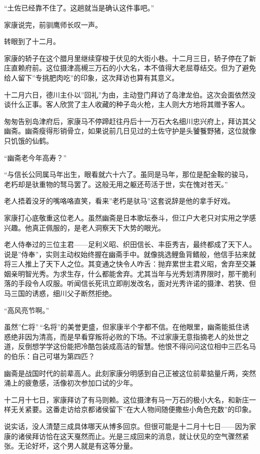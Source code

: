 \documentclass[
]{article}
\begin{document}
``土佐已经靠不住了。这趟就当是确认这件事吧。''

家康说完，前驯鹰师长叹一声。

转眼到了十二月。

家康的轿子在这个腊月里继续穿梭于伏见的大街小巷。十二月三日，轿子停在了新庄直赖府前。这位摄津高槻三万石的小大名，本不值得大老屈尊结交。但为了避免给人留下''专挑肥肉吃''的印象，这次拜访也算有其意义。

十二月六日，德川主仆以''回礼''为由，主动登门拜访了岛津龙伯。这次会面依然没谈什么正事。客人欣赏了主人收藏的种子岛火枪，主人则大方地将其赠予客人。

匆匆告别岛津府后，家康马不停蹄赶往丹后十一万石大名细川忠兴府上，拜访其父幽斋。幽斋瘦得形销骨立，如果说前几日见过的土佐守护是头饕餮野猪，这位就像只饥饿的仙鹤。

``幽斋老今年高寿？''

``与信长公同属马年出生，眼看就六十六了。虽同是马年，那位是配金鞍的骏马，老朽却是驮重物的驽马罢了。这般无用之躯还苟活于世，实在愧对苍天。''

老人捂着没牙的嘴咯咯直笑，看来''老朽是驮马''这套说辞是他的拿手好戏。

家康打心底敬重这位老人。虽然幽斋是日本歌坛泰斗，但江户大老只对实用之学感兴趣。他真正佩服的，是老人洞察天下大势的眼光。

老人侍奉过的三位主君------足利义昭、织田信长、丰臣秀吉，最终都成了天下人。说是''侍奉''，实则主动权始终握在幽斋手中。就像挑选鲤鱼背鳍般，他信手拈来就将三人推上了天下人之位。其变通之快令人咋舌：抛弃累世主君义昭，舍弃至交兼姻亲明智光秀。为求生存，什么都能舍弃。尤其当年与光秀划清界限时，那干脆利落的手段令人叹服。听闻信长死讯立即削发改名，面对光秀许诺的摄津、若狭、但马三国的诱惑，细川父子断然拒绝。

``高风亮节啊。''

虽然''仁将''\,``名将''的美誉更盛，但家康半个字都不信。在他眼里，幽斋能抵住诱惑绝非因为清高，而是早看穿叛将必败的下场。不过家康无意指摘老人的处世之道，反倒想学学这份能把冷酷包装成高洁的智慧。他恨不得问问这位相中三匹名马的伯乐：自己可堪为第四匹？

幽斋是战国时代的前辈高人。此刻家康分明感到自己正被这位前辈掂量斤两，突然涌上的疲惫感，活像初次参加口试的少年。

十二月十七日，家康拜访了有马则赖。这位摄津有马一万石的极小大名，和新庄一样无关紧要。这番走访给京都诸侯留下''在大人物间随便撒些小角色充数''的印象。

说实话，没人清楚三成具体哪天从博多回京。但很可能是十二月十七日------因为家康的诸侯拜访恰在这天戛然而止。光是三成回来的消息，就让伏见的空气骤然紧张。无论好坏，这个男人就是有这等分量。
\end{document}
